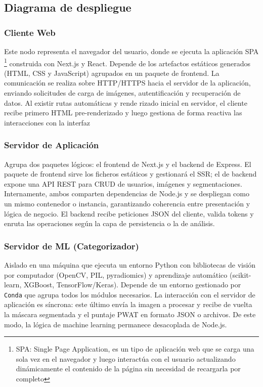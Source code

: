 \subsection{Diagrama de despliegue}
\label{ssc:diagDesp}

\subsubsection{Cliente Web}
Este nodo representa el navegador del usuario, donde se ejecuta la aplicación SPA \footnote{SPA: Single Page Application, es un tipo de aplicación web que se carga una sola vez en el navegador y luego interactúa con el usuario actualizando dinámicamente el contenido de la página sin necesidad de recargarla por completo} construida con Next.js y React. Depende de los artefactos estáticos generados (HTML, CSS y JavaScript) agrupados en un paquete de frontend. La comunicación se realiza sobre HTTP/HTTPS hacia el servidor de la aplicación, enviando solicitudes de carga de imágenes, autentificación y recuperación de datos. Al existir rutas automáticas y rende rizado inicial en servidor, el cliente recibe primero HTML pre-renderizado y luego gestiona de forma reactiva las interacciones con la interfaz

\subsubsection{Servidor de Aplicación}
Agrupa dos paquetes lógicos: el frontend de Next.js y el backend de Express. El paquete de frontend sirve los ficheros estáticos y gestionará el SSR; el de backend expone una API REST para CRUD de usuarios, imágenes y segmentaciones. Internamente, ambos comparten dependencias de Node.js y se despliegan como un mismo contenedor o instancia, garantizando coherencia entre presentación y lógica de negocio. El backend recibe peticiones JSON del cliente, valida tokens y enruta las operaciones según la capa de persistencia o la de análisis.

\subsubsection{Servidor de ML (Categorizador)}
Aislado en una máquina que ejecuta un entorno Python con bibliotecas de visión por computador (OpenCV, PIL, pyradiomics) y aprendizaje automático (scikit-learn, XGBoost, TensorFlow/Keras). Depende de un entorno gestionado por \texttt{Conda} que agrupa todos los módulos necesarios. La interacción con el servidor de aplicación es síncrona: este último envía la imagen a procesar y recibe de vuelta la máscara segmentada y el puntaje PWAT en formato JSON o archivos. De este modo, la lógica de machine learning permanece desacoplada de Node.js.

